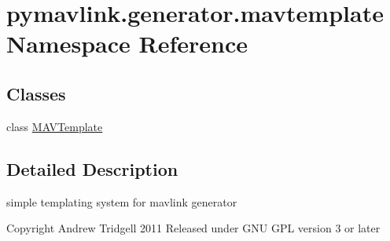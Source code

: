 \hypertarget{namespacepymavlink_1_1generator_1_1mavtemplate}{}\section{pymavlink.\+generator.\+mavtemplate Namespace Reference}
\label{namespacepymavlink_1_1generator_1_1mavtemplate}
\subsection*{Classes}
\begin{DoxyCompactItemize}
\item 
class \hyperlink{classpymavlink_1_1generator_1_1mavtemplate_1_1MAVTemplate}{M\+A\+V\+Template}
\end{DoxyCompactItemize}


\subsection{Detailed Description}
\begin{DoxyVerb}simple templating system for mavlink generator

Copyright Andrew Tridgell 2011
Released under GNU GPL version 3 or later
\end{DoxyVerb}
 